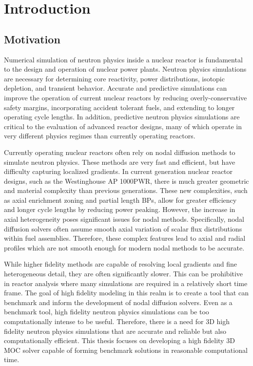 \chapter{Introduction}
\label{chap:intro}

\section{Motivation}
\label{sec:chap1-motivation}


Numerical simulation of neutron physics inside a nuclear reactor is fundamental to the design and operation of nuclear power plants. Neutron physics simulations are necessary for determining core reactivity, power distributions, isotopic depletion, and transient behavior. Accurate and predictive simulations can improve the operation of current nuclear reactors by reducing overly-conservative safety margins, incorporating accident tolerant fuels, and extending to longer operating cycle lengths. In addition, predictive neutron physics simulations are critical to the evaluation of advanced reactor designs, many of which operate in very different physics regimes than currently operating reactors. 

Currently operating nuclear reactors often rely on nodal diffusion methods to simulate neutron physics. These methods are very fast and efficient, but have difficulty capturing localized gradients. In current generation nuclear reactor designs, such as the Westinghouse AP 1000\texttrademark \ac{PWR}, there is much greater geometric and material complexity than previous generations. These new complexities, such as axial enrichment zoning and partial length \acp{BP}, allow for greater efficiency and longer cycle lengths by reducing power peaking. However, the increase in axial heterogeneity poses significant issues for nodal methods. Specifically, nodal diffusion solvers often assume smooth axial variation of scalar flux distributions within fuel assemblies. Therefore, these complex features  lead to axial and radial profiles which are not smooth enough for modern nodal methods to be accurate.

While higher fidelity methods are capable of resolving local gradients and fine heterogeneous detail, they are often significantly slower. This can be prohibitive in reactor analysis where many simulations are required in a relatively short time frame. The goal of high fidelity modeling in this realm is to create a tool that can benchmark and inform the development of nodal diffusion solvers. Even as a benchmark tool, high fidelity neutron physics simulations can be too computationally intense to be useful. Therefore, there is a need for 3D high fidelity neutron physics simulations that are accurate and reliable but also computationally efficient. This thesis focuses on developing a high fidelity 3D \ac{MOC} solver capable of forming benchmark solutions in reasonable computational time.

